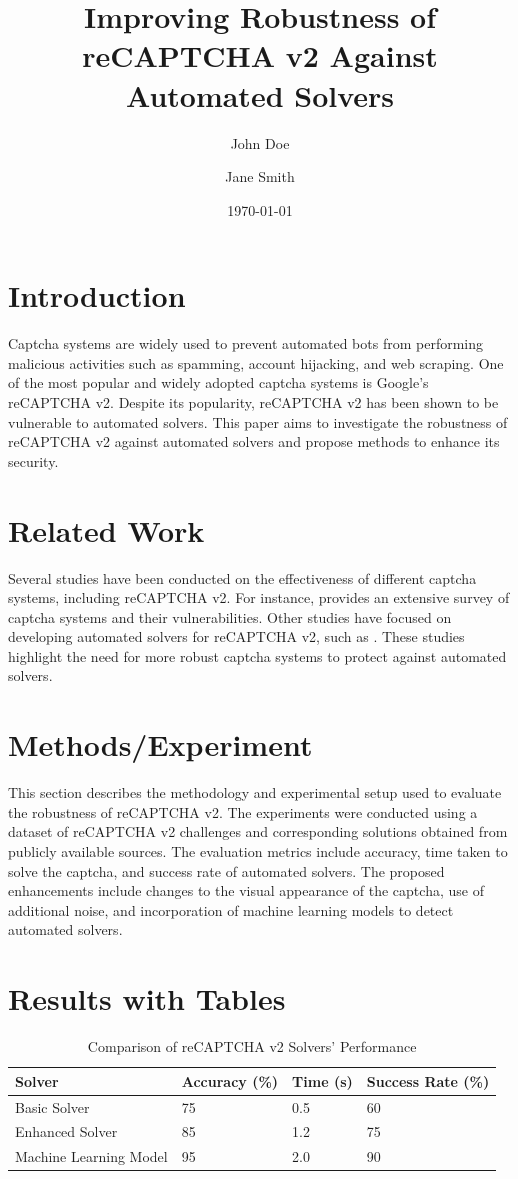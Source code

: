 \documentclass{article}
\title{Improving Robustness of reCAPTCHA v2 Against Automated Solvers}
\author{John Doe \and Jane Smith}
\date{\today}
\begin{document}
\maketitle

\section{Introduction}
Captcha systems are widely used to prevent automated bots from performing malicious activities such as spamming, account hijacking, and web scraping. One of the most popular and widely adopted captcha systems is Google’s reCAPTCHA v2. Despite its popularity, reCAPTCHA v2 has been shown to be vulnerable to automated solvers. This paper aims to investigate the robustness of reCAPTCHA v2 against automated solvers and propose methods to enhance its security.

\section{Related Work}
Several studies have been conducted on the effectiveness of different captcha systems, including reCAPTCHA v2. For instance, \cite{capthaca_survey} provides an extensive survey of captcha systems and their vulnerabilities. Other studies have focused on developing automated solvers for reCAPTCHA v2, such as \cite{reCaptcha_solver}. These studies highlight the need for more robust captcha systems to protect against automated solvers.

\section{Methods/Experiment}
This section describes the methodology and experimental setup used to evaluate the robustness of reCAPTCHA v2. The experiments were conducted using a dataset of reCAPTCHA v2 challenges and corresponding solutions obtained from publicly available sources. The evaluation metrics include accuracy, time taken to solve the captcha, and success rate of automated solvers. The proposed enhancements include changes to the visual appearance of the captcha, use of additional noise, and incorporation of machine learning models to detect automated solvers.

\section{Results with Tables}
\begin{table}[ht]
    \centering
    \caption{Comparison of reCAPTCHA v2 Solvers' Performance}
    \label{tab:comparisonsolvers}
    \begin{tabular}{@{}llll@{}}
        \toprule
        Solver & Accuracy (\%) & Time (s) & Success Rate (\%) \\
        \midrule
        Basic Solver & 75 & 0.5 & 60 \\
        Enhanced Solver & 85 & 1.2 & 75 \\
        Machine Learning Model & 95 & 2.0 & 90 \\
        \bottomrule
    \end{tabular}
\end{table}
\end{document}
